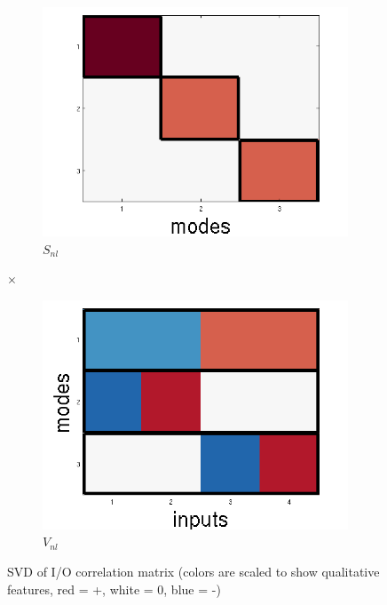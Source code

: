 \documentclass[10pt,letterpaper]{article}
\begin{document}
\begin{figure}
\begin{subfigure}{0.22\textwidth}
\includegraphics[width=\textwidth]{figures/S_nl.png}
\caption{$S_{nl}$}
\end{subfigure}
\LARGE{$\times$}
\begin{subfigure}{0.22\textwidth}
\includegraphics[width=\textwidth]{figures/V_nl.png}
\caption{$V_{nl}$}
\end{subfigure}
\caption{SVD of I/O correlation matrix (colors are scaled to show qualitative features, red = +, white = 0, blue = -)}
\label{regular_SVD_figure}
\end{figure}
\end{document}
